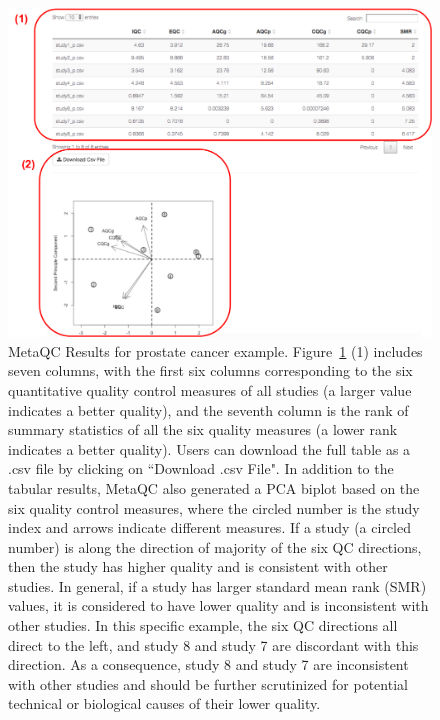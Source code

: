 \begin{figure}[H]
\begin{center}
\includegraphics[scale=0.65]{./figure/metaQC/metaQCresult_Prostate.pdf}
\caption{MetaQC Results for prostate cancer example.
Figure~\ref{fig:MetaQCresult} {\color{red} (1)} includes seven columns, 
with the first six columns corresponding to the six quantitative quality control measures of all studies (a larger value indicates a better quality), and the seventh column is the rank of summary statistics of all the six quality measures (a lower rank indicates a better quality). 
Users can download the full table as a .csv file by clicking on ``Download .csv File". 
In addition to the tabular results, MetaQC also generated a PCA biplot based on the six quality control measures, 
where the circled number is the study index and arrows indicate different measures. 
If a study (a circled number) is along the direction of majority of the six QC directions, then the study has higher quality and is consistent with other studies.
In general, if a study has larger standard mean rank (SMR) values, 
it is considered to have lower quality and is inconsistent with other studies.
In this specific example, the six QC directions all direct to the left, 
and study 8 and study 7 are discordant with this direction.
As a consequence, study 8 and study 7 are inconsistent with other studies and should be further scrutinized for potential technical or biological causes of their lower quality. 
}
\label{fig:MetaQCresult}
\end{center}
\end{figure}


